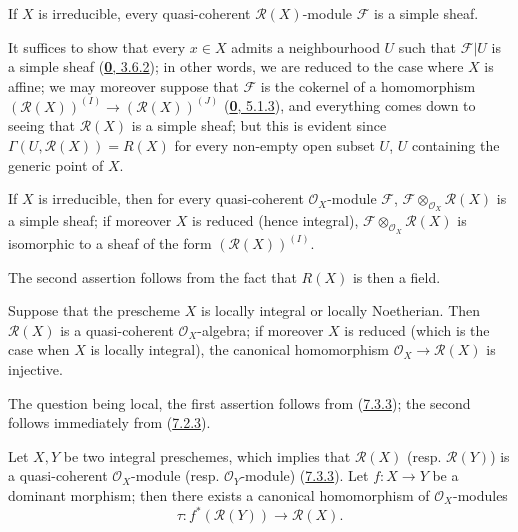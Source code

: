 \begin{corollary}[7.3.5]
\label{I.7.3.5}
If $X$ is irreducible, every quasi-coherent $\mathscr{R}(X)$-module
$\mathscr{F}$ is a simple sheaf.
\end{corollary}

It suffices to show that every $x\in X$ admits a neighbourhood $U$ such that
$\mathscr{F}|U$ is a simple sheaf
(\hyperref[0.3.6.2]{\textbf{0}, 3.6.2}); in other words, we are reduced to the case
where $X$ is affine; we may moreover suppose that $\mathscr{F}$ is the
cokernel of a homomorphism
$(\mathscr{R}(X))^{(I)}\to(\mathscr{R}(X))^{(J)}$
(\hyperref[0.5.1.3]{\textbf{0}, 5.1.3}), and everything comes down to seeing that
$\mathscr{R}(X)$ is a simple sheaf; but this is evident since
$\Gamma(U,\mathscr{R}(X))=R(X)$ for every non-empty open subset $U$, $U$
containing the generic point of $X$.

\begin{corollary}[7.3.6]
\label{I.7.3.6}
If $X$ is irreducible, then for every quasi-coherent $\mathscr{O}_X$-module
$\mathscr{F}$, $\mathscr{F}\otimes_{\mathscr{O}_X}\mathscr{R}(X)$ is a simple
sheaf; if moreover $X$ is reduced (hence integral),
$\mathscr{F}\otimes_{\mathscr{O}_X}\mathscr{R}(X)$ is isomorphic to a sheaf of
the form $(\mathscr{R}(X))^{(I)}$.
\end{corollary}

The second assertion follows from the fact that $R(X)$ is then a field.

\begin{proposition}[7.3.7]
\label{I.7.3.7}
Suppose that the prescheme $X$ is locally integral or locally
Noetherian. Then $\mathscr{R}(X)$ is a quasi-coherent $\mathscr{O}_X$-algebra;
if moreover $X$ is reduced (which is the case when $X$ is locally integral),
the canonical homomorphism $\mathscr{O}_X\to\mathscr{R}(X)$ is injective.
\end{proposition}

The question being local, the first assertion follows from
(\hyperref[I.7.3.3]{7.3.3}); the second follows immediately from
(\hyperref[I.7.2.3]{7.2.3}).

\begin{env}[7.3.8]
\label{I.7.3.8}
Let $X,Y$ be two integral preschemes, which implies that $\mathscr{R}(X)$
(resp. $\mathscr{R}(Y)$) is a quasi-coherent $\mathscr{O}_X$-module (resp.
$\mathscr{O}_Y$-module) (\hyperref[I.7.3.3]{7.3.3}). Let $f:X\to Y$ be a
dominant morphism; then there exists a canonical homomorphism of
$\mathscr{O}_X$-modules
\[
  \tau:f^*(\mathscr{R}(Y))\to\mathscr{R}(X).
\tag{7.3.8.1}
\label{I.7.3.8.1}
\]
\end{env}

